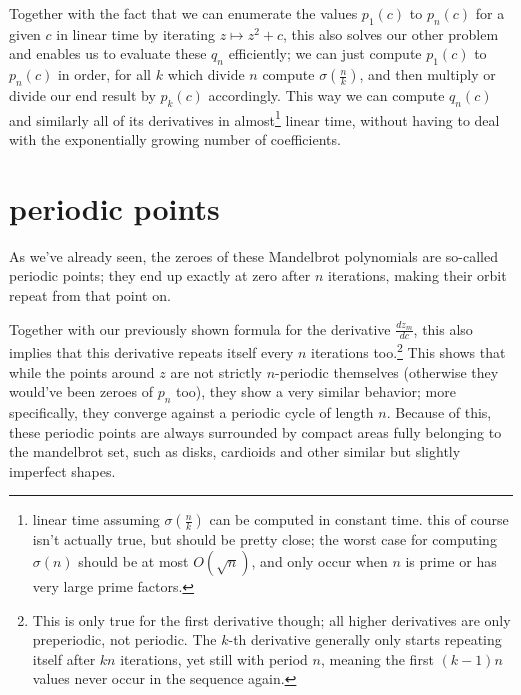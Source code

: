 \documentclass[12pt,a4paper]{article}
\begin{document}
Together with the fact that we can enumerate the values $p_1(c)$ to $p_n(c)$ for a given $c$ in linear time by iterating $z\mapsto z^2+c$, this also solves our other problem and enables us to evaluate these $q_n$ efficiently; we can just compute $p_1(c)$ to $p_n(c)$ in order, for all $k$ which divide $n$ compute $\sigma(\frac nk)$, and then multiply or divide our end result by $p_k(c)$ accordingly. This way we can compute $q_n(c)$ and similarly all of its derivatives in almost\footnote{linear time assuming $\sigma(\frac nk)$ can be computed in constant time. this of course isn't actually true, but should be pretty close; the worst case for computing $\sigma(n)$ should be at most $O(\sqrt n)$, and only occur when $n$ is prime or has very large prime factors.} linear time, without having to deal with the exponentially growing number of coefficients.

\section{periodic points}

As we've already seen, the zeroes of these Mandelbrot polynomials are so-called periodic points; they end up exactly at zero after $n$ iterations, making their orbit repeat from that point on.

Together with our previously shown formula for the derivative $\frac{dz_m}{dc}$, this also implies that this derivative repeats itself every $n$ iterations too.\footnote{This is only true for the first derivative though; all higher derivatives are only preperiodic, not periodic. The $k$-th derivative generally only starts repeating itself after $kn$ iterations, yet still with period $n$, meaning the first $(k-1)n$ values never occur in the sequence again.} This shows that while the points around $z$ are not strictly $n$-periodic themselves (otherwise they would've been zeroes of $p_n$ too), they show a very similar behavior; more specifically, they converge against a periodic cycle of length $n$. Because of this, these periodic points are always surrounded by compact areas fully belonging to the mandelbrot set, such as disks, cardioids and other similar but slightly imperfect shapes.
\end{document}
